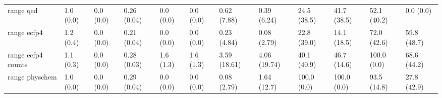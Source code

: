 \begin{tabular}{llllllllllll}
range qed & {\cellcolor[HTML]{F6FCFD}} \color[HTML]{000000} 1.0 (0.0) & {\cellcolor[HTML]{F7FCFD}} \color[HTML]{000000} 0.0 (0.0) & {\cellcolor[HTML]{C8EBE4}} \color[HTML]{000000} 0.26 (0.04) & {\cellcolor[HTML]{F7FCFD}} \color[HTML]{000000} 0.0 (0.0) & {\cellcolor[HTML]{F7FCFD}} \color[HTML]{000000} 0.0 (0.0) & {\cellcolor[HTML]{F6FCFD}} \color[HTML]{000000} 0.62 (7.88) & {\cellcolor[HTML]{F6FCFD}} \color[HTML]{000000} 0.39 (6.24) & {\cellcolor[HTML]{CDECE7}} \color[HTML]{000000} 24.5 (38.5) & {\cellcolor[HTML]{88D1BD}} \color[HTML]{000000} 41.7 (38.5) & {\cellcolor[HTML]{60BF9C}} \color[HTML]{000000} 52.1 (40.2) & {\cellcolor[HTML]{F7FCFD}} \color[HTML]{000000} 0.0 (0.0) \\
range ecfp4 & {\cellcolor[HTML]{F5FBFD}} \color[HTML]{000000} 1.2 (0.4) & {\cellcolor[HTML]{F7FCFD}} \color[HTML]{000000} 0.0 (0.0) & {\cellcolor[HTML]{D5EFED}} \color[HTML]{000000} 0.21 (0.04) & {\cellcolor[HTML]{F7FCFD}} \color[HTML]{000000} 0.0 (0.0) & {\cellcolor[HTML]{F7FCFD}} \color[HTML]{000000} 0.0 (0.0) & {\cellcolor[HTML]{F7FCFD}} \color[HTML]{000000} 0.23 (4.84) & {\cellcolor[HTML]{F7FCFD}} \color[HTML]{000000} 0.08 (2.79) & {\cellcolor[HTML]{D1EEE9}} \color[HTML]{000000} 22.8 (39.0) & {\cellcolor[HTML]{E2F4F7}} \color[HTML]{000000} 14.1 (18.5) & {\cellcolor[HTML]{2A9350}} \color[HTML]{F1F1F1} 72.0 (42.6) & {\cellcolor[HTML]{48B27F}} \color[HTML]{F1F1F1} 59.8 (48.7) \\
range ecfp4 counts & {\cellcolor[HTML]{F6FCFD}} \color[HTML]{000000} 1.1 (0.3) & {\cellcolor[HTML]{F7FCFD}} \color[HTML]{000000} 0.0 (0.0) & {\cellcolor[HTML]{C0E7DF}} \color[HTML]{000000} 0.28 (0.03) & {\cellcolor[HTML]{F5FBFC}} \color[HTML]{000000} 1.6 (1.3) & {\cellcolor[HTML]{F5FBFC}} \color[HTML]{000000} 1.6 (1.3) & {\cellcolor[HTML]{F2FAFC}} \color[HTML]{000000} 3.59 (18.61) & {\cellcolor[HTML]{F1FAFC}} \color[HTML]{000000} 4.06 (19.74) & {\cellcolor[HTML]{8FD4C2}} \color[HTML]{000000} 40.1 (40.9) & {\cellcolor[HTML]{74C8AE}} \color[HTML]{000000} 46.7 (14.6) & {\cellcolor[HTML]{00441B}} \color[HTML]{F1F1F1} 100.0 (0.0) & {\cellcolor[HTML]{329D5E}} \color[HTML]{F1F1F1} 68.6 (44.2) \\
range physchem & {\cellcolor[HTML]{F6FCFD}} \color[HTML]{000000} 1.0 (0.0) & {\cellcolor[HTML]{F7FCFD}} \color[HTML]{000000} 0.0 (0.0) & {\cellcolor[HTML]{BCE6DD}} \color[HTML]{000000} 0.29 (0.04) & {\cellcolor[HTML]{F7FCFD}} \color[HTML]{000000} 0.0 (0.0) & {\cellcolor[HTML]{F7FCFD}} \color[HTML]{000000} 0.0 (0.0) & {\cellcolor[HTML]{F7FCFD}} \color[HTML]{000000} 0.08 (2.79) & {\cellcolor[HTML]{F5FBFC}} \color[HTML]{000000} 1.64 (12.7) & {\cellcolor[HTML]{00441B}} \color[HTML]{F1F1F1} 100.0 (0.0) & {\cellcolor[HTML]{00441B}} \color[HTML]{F1F1F1} 100.0 (0.0) & {\cellcolor[HTML]{005924}} \color[HTML]{F1F1F1} 93.5 (14.8) & {\cellcolor[HTML]{C0E7DF}} \color[HTML]{000000} 27.8 (42.9) \\

\end{tabular}
